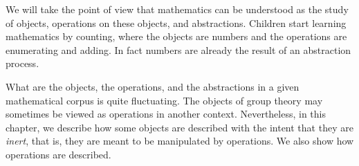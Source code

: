 \label{ch:prog}

%
%

We will take the point of view that mathematics can be understood as
the study of objects, operations on these objects, and
abstractions.
Children start learning mathematics by counting, where the objects are
numbers and the operations are enumerating and adding.  In fact
numbers are already the result of an abstraction process.

What are the objects, the operations, and the abstractions in a given
mathematical corpus is quite fluctuating.  The objects of group theory
may sometimes be viewed as operations in another context.  Nevertheless,
in this chapter, we describe how some objects are described with the intent
that they are {\em inert}, that is, they are meant to be
manipulated by operations.  We also show how operations are described.

